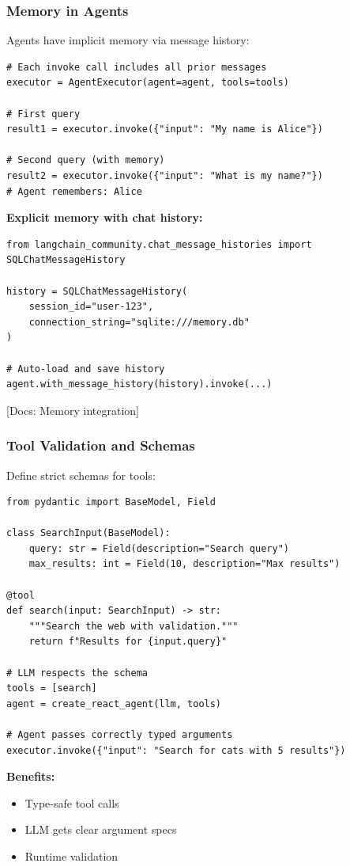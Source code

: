 \documentclass[aspectratio=169,11pt]{beamer}
\newcommand{\docref}[1]{{\scriptsize\color{docgray}[Docs: #1]}}
\begin{document}
\begin{frame}[fragile]
\frametitle{Memory in Agents}

Agents have implicit memory via message history:

\begin{lstlisting}
# Each invoke call includes all prior messages
executor = AgentExecutor(agent=agent, tools=tools)

# First query
result1 = executor.invoke({"input": "My name is Alice"})

# Second query (with memory)
result2 = executor.invoke({"input": "What is my name?"})
# Agent remembers: Alice
\end{lstlisting}

\textbf{Explicit memory with chat history:}

\begin{lstlisting}
from langchain_community.chat_message_histories import SQLChatMessageHistory

history = SQLChatMessageHistory(
    session_id="user-123",
    connection_string="sqlite:///memory.db"
)

# Auto-load and save history
agent.with_message_history(history).invoke(...)
\end{lstlisting}

\docref{Memory integration}

\end{frame}

\begin{frame}[fragile]
\frametitle{Tool Validation and Schemas}

Define strict schemas for tools:

\begin{lstlisting}
from pydantic import BaseModel, Field

class SearchInput(BaseModel):
    query: str = Field(description="Search query")
    max_results: int = Field(10, description="Max results")

@tool
def search(input: SearchInput) -> str:
    """Search the web with validation."""
    return f"Results for {input.query}"

# LLM respects the schema
tools = [search]
agent = create_react_agent(llm, tools)

# Agent passes correctly typed arguments
executor.invoke({"input": "Search for cats with 5 results"})
\end{lstlisting}

\textbf{Benefits:}
\begin{itemize}
  \item Type-safe tool calls
  \item LLM gets clear argument specs
  \item Runtime validation
\end{itemize}

\end{frame}
\end{document}
